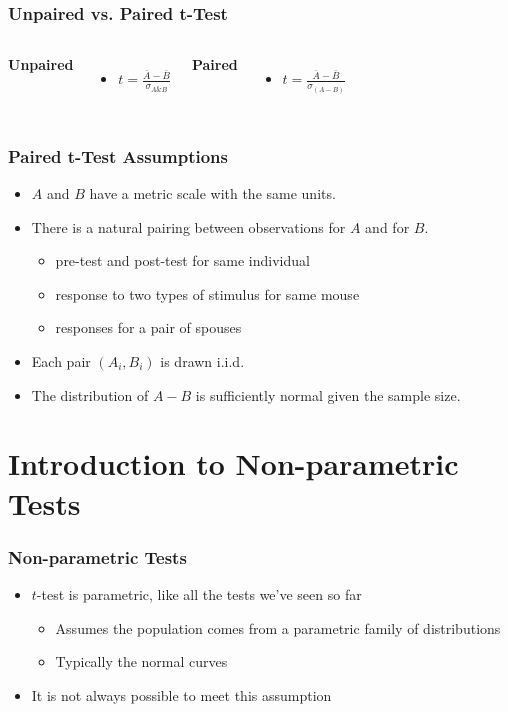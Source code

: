 \documentclass[12pt, block=fill]{beamer}
\begin{document}
\begin{frame}
  \frametitle{Unpaired vs. Paired t-Test}

  \begin{columns}[t]
    \textbf{Unpaired}
    \begin{itemize}
      \item $t = \frac{\bar{A} - \bar{B}} {\sigma_{A\&B}}$
    \end{itemize}
    \textbf{Paired}
    \begin{itemize}
    \item $t = \frac{\bar{A} - \bar{B}}{\sigma_{(A - B)}}$
    \end{itemize}
  \end{columns}

\end{frame}

\begin{frame}
  \frametitle{Paired t-Test Assumptions}

  \begin{itemize}
  \item $A$ and $B$ have a metric scale with the same units.
  \item There is a natural pairing between observations for $A$ and for $B$.
    \begin{itemize}
    \item pre-test and post-test for same individual
    \item response to two types of stimulus for same mouse
    \item responses for a pair of spouses
    \end{itemize}
  \item Each pair $(A_i, B_i)$ is drawn i.i.d.
  \item The distribution of $A-B$ is sufficiently normal given the sample size.

  \end{itemize}
\end{frame}



\section{Introduction to Non-parametric Tests}

\begin{frame}
  \frametitle{Non-parametric Tests}
  
  \begin{itemize}
    \item $t$-test is parametric, like all the tests we've seen so far
    \begin{itemize}
      \item Assumes the population comes from a parametric family of distributions
      \item Typically the normal curves
    \end{itemize}
    \item It is not always possible to meet this assumption
  \end{itemize}
  
\end{frame}
\end{document}
